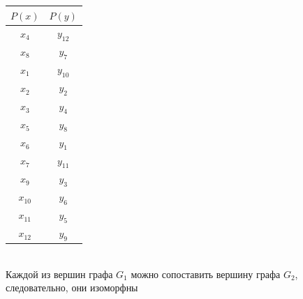 \documentclass[12pt,a4paper]{report}
\begin{document}
\begin{tabular}{|c|c|}
    \hline
    $P(x)$ & $P(y)$ \\
    \hline
    $x_4$ & $y_{12}$ \\
    \hline
    $x_8$ & $y_7$ \\
    \hline
    \hline
    $x_1$ & $y_{10}$ \\
    \hline
    $x_2$ & $y_2$ \\
    \hline
    $x_3$ & $y_4$ \\
    \hline
    $x_{5}$ & $y_8$ \\
    \hline
    $x_6$ & $y_1$ \\
    \hline
    $x_7$ & $y_{11}$ \\
    \hline
    $x_9$ & $y_3$ \\
    \hline
    $x_{10}$ & $y_6$ \\
    \hline
    $x_{11}$ & $y_5$ \\
    \hline
    $x_{12}$ & $y_9$ \\
    \hline
\end{tabular}\\
\hfill\break
Каждой из вершин графа $G_1$ можно сопоставить вершину графа $G_2$, следовательно, они изоморфны
\end{document}
